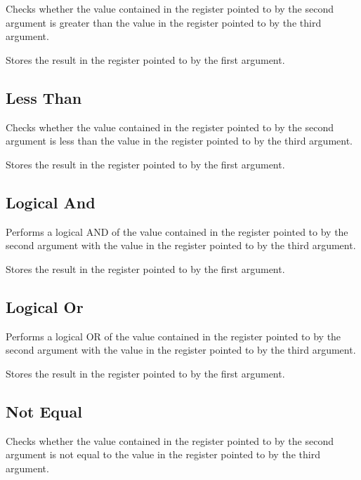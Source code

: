 
Checks whether the value contained in the register pointed to by the second argument is greater than the value in the register pointed to by the third argument.

Stores the result in the register pointed to by the first argument.

\subsection{Less Than}


Checks whether the value contained in the register pointed to by the second argument is less than the value in the register pointed to by the third argument.

Stores the result in the register pointed to by the first argument.

\subsection{Logical And}


Performs a logical AND of the value contained in the register pointed to by the second argument with the value in the register pointed to by the third argument.

Stores the result in the register pointed to by the first argument.

\subsection{Logical Or}


Performs a logical OR of the value contained in the register pointed to by the second argument with the value in the register pointed to by the third argument.

Stores the result in the register pointed to by the first argument.

\subsection{Not Equal}


Checks whether the value contained in the register pointed to by the second argument is not equal to the value in the register pointed to by the third argument.

